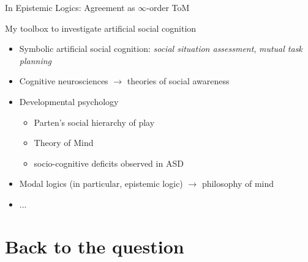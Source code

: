 \documentclass[compress]{beamer}
\begin{document}
{
\begin{frame}{In Epistemic Logics: Agreement as $\infty$-order ToM}
\end{frame}
}


\begin{frame}{My toolbox to investigate artificial social cognition}
    \begin{itemize}
        \item Symbolic artificial social cognition: \emph{social situation
            assessment}, \emph{mutual task planning}
        \item Cognitive neurosciences $\rightarrow$ theories of social
            awareness
        \item Developmental psychology
            \begin{itemize}
                \item Parten's social hierarchy of play
                \item Theory of Mind
                \item socio-cognitive deficits observed in ASD
            \end{itemize}
        \item Modal logics (in particular, epistemic logic) $\rightarrow$
            philosophy of mind
        \item ...
    \end{itemize}
\end{frame}



\section{Back to the question}
\end{document}
